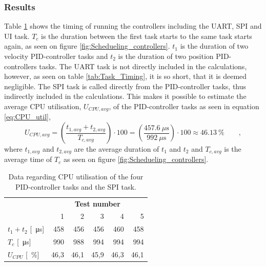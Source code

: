 \documentclass[../../main.tex]{subfiles}
\begin{document}
\subsubsection*{Results}
Table \ref{tab:CPU_utilisation_test} shows the timing of running the controllers including the UART, SPI and UI task. $T_c$ is the duration between the first task starts to the same task starts again, as seen on figure \ref{fig:Schedueling_controllers}. $t_1$ is the duration of two velocity PID-controller tasks and $t_2$ is the duration of two position PID-controllers tasks. The UART task is not directly included in the calculations, however, as seen on table \ref{tab:Task_Timing}, it is so short, that it is deemed negligible. The SPI task is called directly from the PID-controller tasks, thus indirectly included in the calculations. This makes it possible to estimate the average CPU utilisation, $ U_{CPU,avg} $, of the PID-controller tasks as seen in equation \ref{eq:CPU_util},
\begin{equation}\label{eq:CPU_util}
    U_{CPU,avg} =\left(\frac{t_{1,avg} + t_{2,avg}}{T_{c,avg}}\right)\cdot 100=\left(\frac{\SI{457,6}{\mu\second}}{\SI{992}{\mu\second}}\right)\cdot 100\approx \SI{46,13}{\percent} \qquad , 
\end{equation}
where $t_{1,avg}$ and $ t_{2,avg}$ are the average duration of $t_1$ and $t_2$ and $T_{c,avg}$ is the average time of $T_c$ as seen on figure \ref{fig:Schedueling_controllers}. 

\begin{table}[H]
\centering
\begin{tabular}{lrrrrr}
\multicolumn{1}{c}{\textbf{}}            & \multicolumn{5}{c}{\textbf{Test number}}                                                                                              \\
\multicolumn{1}{r|}{}                    & \multicolumn{1}{r|}{1}    & \multicolumn{1}{r|}{2}    & \multicolumn{1}{r|}{3}    & \multicolumn{1}{r|}{4}    & \multicolumn{1}{r}{5} \\ \hline
\multicolumn{1}{l|}{$t_1 + t_2$ [\SI{}{\micro\second}]} & \multicolumn{1}{r|}{458}  & \multicolumn{1}{r|}{456}  & \multicolumn{1}{r|}{456}  & \multicolumn{1}{r|}{460}  & 458                   \\
\multicolumn{1}{l|}{$T_c$ [\SI{}{\micro\second}]}                 & \multicolumn{1}{r|}{990}  & \multicolumn{1}{r|}{988}  & \multicolumn{1}{r|}{994}  & \multicolumn{1}{r|}{994}  & 994                   \\
\multicolumn{1}{l|}{$U_{CPU}$ [\SI{}{\percent}]}          & \multicolumn{1}{r|}{46,3} & \multicolumn{1}{r|}{46,1} & \multicolumn{1}{r|}{45,9} & \multicolumn{1}{r|}{46,3} & 46,1                 
\end{tabular}
\caption{Data regarding CPU utilisation of the four PID-controller tasks and the SPI task.}
\label{tab:CPU_utilisation_test}
\end{table}
\end{document}
